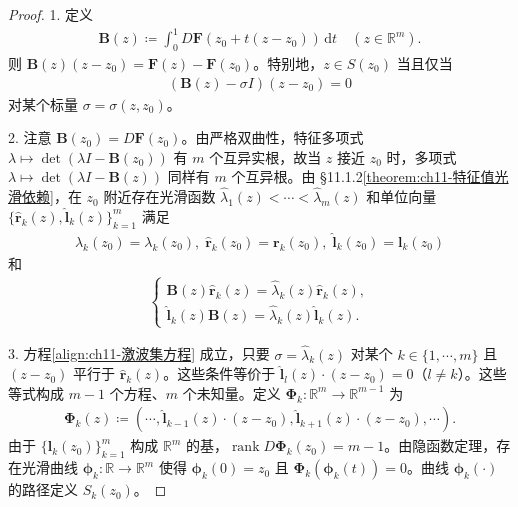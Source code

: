 \documentclass[../../main.tex]{subfiles}
\begin{document}
\begin{proof}
1. 定义
\begin{align*}
\mathbf{B}(z)\coloneqq\int_0^1 D\mathbf{F}(z_0+t(z-z_0))\,\mathrm{d}t \quad (z\in\mathbb{R}^m).
\end{align*}
则 $\mathbf{B}(z)(z-z_0)=\mathbf{F}(z)-\mathbf{F}(z_0)$。特别地，$z\in S(z_0)$ 当且仅当
\begin{align}
(\mathbf{B}(z)-\sigma I)(z-z_0)=0
\label{align:ch11-激波集方程}
\end{align}
对某个标量 $\sigma=\sigma(z,z_0)$。

2. 注意 $\mathbf{B}(z_0)=D\mathbf{F}(z_0)$。由严格双曲性，特征多项式 $\lambda\mapsto\det(\lambda I-\mathbf{B}(z_0))$ 有 $m$ 个互异实根，故当 $z$ 接近 $z_0$ 时，多项式 $\lambda\mapsto\det(\lambda I-\mathbf{B}(z))$ 同样有 $m$ 个互异根。由 \S11.1.2\cref{theorem:ch11-特征值光滑依赖}，在 $z_0$ 附近存在光滑函数 $\widehat{\lambda}_1(z)<\cdots<\widehat{\lambda}_m(z)$ 和单位向量 $\{\widehat{\mathbf{r}}_k(z),\widehat{\mathbf{l}}_k(z)\}_{k=1}^m$ 满足
\begin{align*}
\widehat{\lambda}_k(z_0)=\lambda_k(z_0),\;\widehat{\mathbf{r}}_k(z_0)=\mathbf{r}_k(z_0),\;\widehat{\mathbf{l}}_k(z_0)=\mathbf{l}_k(z_0)
\end{align*}
和
\begin{align*}
\begin{cases}
\mathbf{B}(z)\widehat{\mathbf{r}}_k(z)=\widehat{\lambda}_k(z)\widehat{\mathbf{r}}_k(z),\\
\widehat{\mathbf{l}}_k(z)\mathbf{B}(z)=\widehat{\lambda}_k(z)\widehat{\mathbf{l}}_k(z).
\end{cases}
\end{align*}

3. 方程\eqref{align:ch11-激波集方程} 成立，只要 $\sigma=\widehat{\lambda}_k(z)$ 对某个 $k\in\{1,\cdots,m\}$ 且 $(z-z_0)$ 平行于 $\widehat{\mathbf{r}}_k(z)$。这些条件等价于 $\widehat{\mathbf{l}}_l(z)\cdot(z-z_0)=0$（$l\neq k$）。这些等式构成 $m-1$ 个方程、$m$ 个未知量。定义 $\boldsymbol{\Phi}_k:\mathbb{R}^m\to\mathbb{R}^{m-1}$ 为
\begin{align*}
\boldsymbol{\Phi}_k(z)\coloneqq(\cdots,\widehat{\mathbf{l}}_{k-1}(z)\cdot(z-z_0),\widehat{\mathbf{l}}_{k+1}(z)\cdot(z-z_0),\cdots).
\end{align*}
由于 $\{\mathbf{l}_k(z_0)\}_{k=1}^m$ 构成 $\mathbb{R}^m$ 的基，$\operatorname{rank}D\boldsymbol{\Phi}_k(z_0)=m-1$。由隐函数定理，存在光滑曲线 $\boldsymbol{\phi}_k:\mathbb{R}\to\mathbb{R}^m$ 使得 $\boldsymbol{\phi}_k(0)=z_0$ 且 $\boldsymbol{\Phi}_k(\boldsymbol{\phi}_k(t))=0$。曲线 $\boldsymbol{\phi}_k(\cdot)$ 的路径定义 $S_k(z_0)$。


\end{proof}
\end{document}

